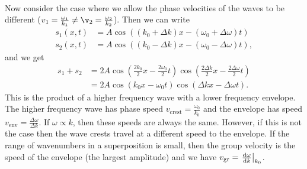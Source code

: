 \documentclass[../classical_mechanics.tex]{subfiles}
\begin{document}
        \paragraph{}
        Now consider the case where we allow the phase velocities of the waves to be different ($v_1=\frac{\omega_1}{k_1}\neq\v_2=\frac{\omega_2}{k_2}$).
        Then we can write
        \begin{align}
            s_1(x,t)&=A\cos((k_0+\Delta k)x-(\omega_0+\Delta\omega)t)\\
            s_2(x,t)&=A\cos((k_0-\Delta k)x-(\omega_0-\Delta\omega)t),
        \end{align}
        and we get
        \begin{align}
            s_1+s_2&=2A\cos\left(\frac{2k_0}{2}x-\frac{2\omega_0}{2}t\right)\cos\left(\frac{2\Delta k}{2}x-\frac{2\Delta\omega}{2}t\right)\\
            &=2A\cos(k_0x-\omega_0t)\cos(\Delta kx-\Delta\omega t).
        \end{align}
        This is the product of a higher frequency wave with a lower frequency envelope.
        The higher frequency wave has phase speed $v_\text{crest}=\frac{\omega_0}{k_0}$ and the envelope has speed $v_\text{env}=\frac{\Delta\omega}{\Delta k}$.
        If $\omega\propto k$, then these speeds are always the same.
        However, if this is not the case then the wave crests travel at a different speed to the envelope.
        If the range of wavenumbers in a superposition is small, then the group velocity is the speed of the envelope (the largest amplitude) and we have $v_\text{gr}=\left.\dv{\omega}{k}\right|_{k_0}$.
        
\end{document}

